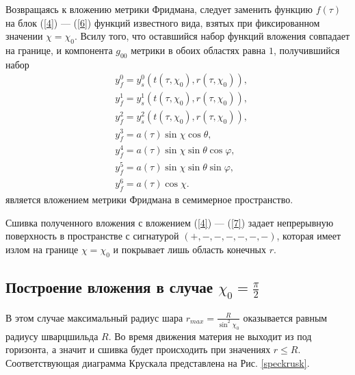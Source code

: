 \documentclass[12pt]{article}
\begin{document}
Возвращаясь к вложению метрики Фридмана, следует заменить функцию $f(\tau)$ на блок (\ref{4}) --- (\ref{6}) функций известного вида, взятых при фиксированном значении $\chi = \chi_0$. Всилу того, что оставшийся набор функций вложения совпадает на границе, и компонента $g_{00}$ метрики в обоих областях равна $1$, получившийся набор
\begin{align}
	&y^0_f = y^0_s(t(\tau, \chi_0), r(\tau, \chi_0)), \\
	&y^1_f = y^1_s(t(\tau, \chi_0), r(\tau, \chi_0)), \\
	&y^2_f = y^2_s(t(\tau, \chi_0), r(\tau, \chi_0)), \\
	&y^3_f = a(\tau) \sin{\chi} \cos{\theta}, \\
	&y^4_f = a(\tau) \sin{\chi} \sin{\theta} \cos{\varphi}, \\
	&y^5_f = a(\tau) \sin{\chi} \sin{\theta} \sin{\varphi}, \\
	&y^6_f = a(\tau) \cos{\chi}.
\end{align}
является вложением метрики Фридмана в семимерное пространство.

Сшивка полученного вложения с вложением (\ref{4}) --- (\ref{7}) задает непрерывную поверхность в пространстве с сигнатурой $(+, -, -, -, -, -, -)$, которая имеет излом на границе  $\chi = \chi_0$ и покрывает лишь область конечных $r$.

\subsection{ Построение вложения в случае $\chi_0 = \frac{\pi}{2}$}

В этом случае максимальный радиус шара $r_{max} = \frac{R}{\sin^2{\chi_0}}$ оказывается равным радиусу шварцшильда $R$. Во время движения материя не выходит из под горизонта, а значит и сшивка будет происходить при значениях $r \leqslant R$. Соответствующая диаграмма Крускала представлена на Рис. \ref{speckrusk}.
\end{document}
